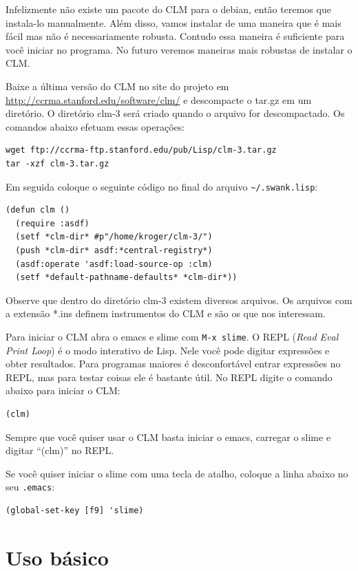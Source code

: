 \documentclass[12pt,brazil]{book}
\begin{document}
Infelizmente não existe um pacote do CLM para o debian, então teremos
que instala-lo manualmente. Além disso, vamos instalar de uma maneira
que é mais fácil mas não é necessariamente robusta. Contudo essa
maneira é suficiente para você iniciar no programa. No futuro veremos
maneiras mais robustas de instalar o CLM.

Baixe a última versão do CLM no site do projeto em
\url{http://ccrma.stanford.edu/software/clm/} e descompacte o tar.gz
em um diretório. O diretório clm-3 será criado quando o arquivo for
descompactado. Os comandos abaixo efetuam essas operações:

\begin{verbatim}
wget ftp://ccrma-ftp.stanford.edu/pub/Lisp/clm-3.tar.gz
tar -xzf clm-3.tar.gz
\end{verbatim}

Em seguida coloque o seguinte código no final do arquivo
\verb|~/.swank.lisp|:

\begin{verbatim}
(defun clm ()
  (require :asdf)
  (setf *clm-dir* #p"/home/kroger/clm-3/")
  (push *clm-dir* asdf:*central-registry*)
  (asdf:operate 'asdf:load-source-op :clm)
  (setf *default-pathname-defaults* *clm-dir*))
\end{verbatim}

Observe que dentro do diretório clm-3 existem diversos arquivos. Os
arquivos com a extensão *.ins definem instrumentos do CLM e são os que
nos interessam. 

Para iniciar o CLM abra o emacs e slime com \texttt{M-x slime}. O REPL
(\textit{Read Eval Print Loop}) é o modo interativo de Lisp. Nele você
pode digitar expressões e obter resultados. Para programas maiores é
desconfortável entrar expressões no REPL, mas para testar coisas ele é
bastante útil. No REPL digite o comando abaixo para iniciar o CLM:

\begin{verbatim}
(clm)
\end{verbatim}

Sempre que você quiser usar o CLM basta iniciar o emacs, carregar o
slime e digitar ``(clm)'' no REPL.

Se você quiser iniciar o slime com uma tecla de atalho, coloque a
linha abaixo no seu \texttt{.emacs}:

\begin{verbatim}
(global-set-key [f9] 'slime)
\end{verbatim}

\section{Uso básico}
\label{sec:uso-basico}
\end{document}
